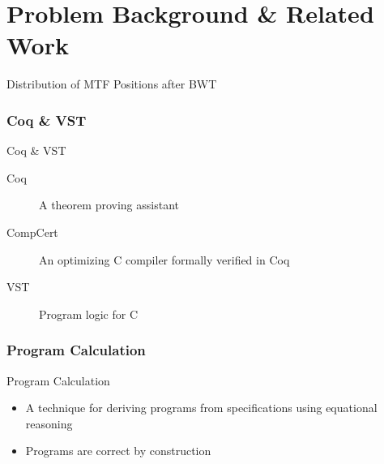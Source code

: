 \documentclass{beamer}
\begin{document}
  \section{Problem Background \& Related Work}

  \begin{frame}{Distribution of MTF Positions after BWT}
    \begin{figure}
    \end{figure}
  \end{frame}

  \subsubsection{Coq \& VST}
  \begin{frame}{Coq \& VST}
    \begin{description}
      \item[Coq] A theorem proving assistant
      \item[CompCert] An optimizing C compiler formally verified in
        Coq
      \item[VST] Program logic for C
    \end{description}
  \end{frame}

  \subsubsection{Program Calculation}
  \begin{frame}{Program Calculation}
    \begin{itemize}
    \item<+-> A technique for deriving programs from specifications using
      \alert{equational reasoning}
    \item<+-> Programs are \alert{correct by construction}
    \end{itemize}
  \end{frame}
\end{document}

